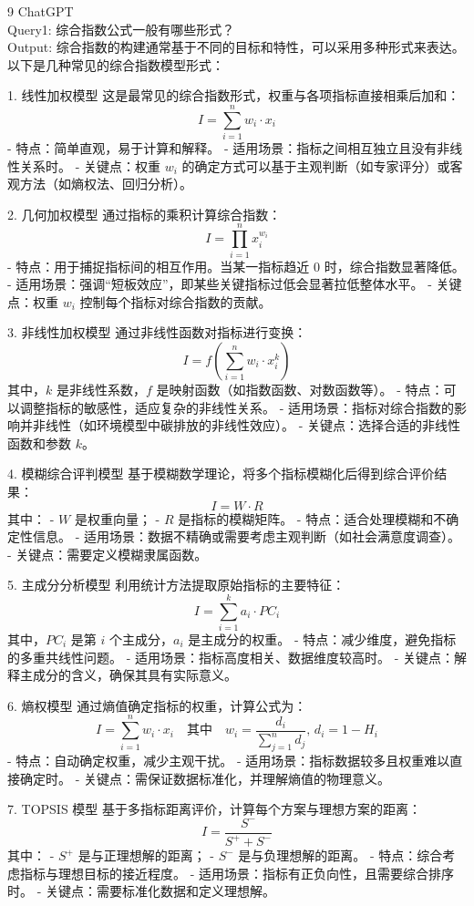 \documentclass[UTF8, fontset=windows]{mcmthesis}
\begin{document}
\begin{ReportAiUse}{9}
ChatGPT\\
Query1: 综合指数公式一般有哪些形式？\\
Output: 综合指数的构建通常基于不同的目标和特性，可以采用多种形式来表达。以下是几种常见的综合指数模型形式：

1. 线性加权模型
这是最常见的综合指数形式，权重与各项指标直接相乘后加和：
\[
I = \sum_{i=1}^n w_i \cdot x_i
\]
- 特点：简单直观，易于计算和解释。
- 适用场景：指标之间相互独立且没有非线性关系时。
- 关键点：权重 \( w_i \) 的确定方式可以基于主观判断（如专家评分）或客观方法（如熵权法、回归分析）。


2. 几何加权模型
通过指标的乘积计算综合指数：
\[
I = \prod_{i=1}^n x_i^{w_i}
\]
- 特点：用于捕捉指标间的相互作用。当某一指标趋近 0 时，综合指数显著降低。
- 适用场景：强调“短板效应”，即某些关键指标过低会显著拉低整体水平。
- 关键点：权重 \( w_i \) 控制每个指标对综合指数的贡献。

3. 非线性加权模型
通过非线性函数对指标进行变换：
\[
I = f\left(\sum_{i=1}^n w_i \cdot x_i^k \right)
\]
其中，\( k \) 是非线性系数，\( f \) 是映射函数（如指数函数、对数函数等）。
- 特点：可以调整指标的敏感性，适应复杂的非线性关系。
- 适用场景：指标对综合指数的影响并非线性（如环境模型中碳排放的非线性效应）。
- 关键点：选择合适的非线性函数和参数 \( k \)。

4. 模糊综合评判模型
基于模糊数学理论，将多个指标模糊化后得到综合评价结果：
\[
I = W \cdot R
\]
其中：
- \( W \) 是权重向量；
- \( R \) 是指标的模糊矩阵。
- 特点：适合处理模糊和不确定性信息。
- 适用场景：数据不精确或需要考虑主观判断（如社会满意度调查）。
- 关键点：需要定义模糊隶属函数。

5. 主成分分析模型
利用统计方法提取原始指标的主要特征：
\[
I = \sum_{i=1}^k a_i \cdot PC_i
\]
其中，\( PC_i \) 是第 \( i \) 个主成分，\( a_i \) 是主成分的权重。
- 特点：减少维度，避免指标的多重共线性问题。
- 适用场景：指标高度相关、数据维度较高时。
- 关键点：解释主成分的含义，确保其具有实际意义。

6. 熵权模型
通过熵值确定指标的权重，计算公式为：
\[
I = \sum_{i=1}^n w_i \cdot x_i \quad \text{其中} \quad w_i = \frac{d_i}{\sum_{j=1}^n d_j}, \, d_i = 1 - H_i
\]
- 特点：自动确定权重，减少主观干扰。
- 适用场景：指标数据较多且权重难以直接确定时。
- 关键点：需保证数据标准化，并理解熵值的物理意义。

7. TOPSIS 模型
基于多指标距离评价，计算每个方案与理想方案的距离：
\[
I = \frac{S^-}{S^+ + S^-}
\]
其中：
- \( S^+ \) 是与正理想解的距离；
- \( S^- \) 是与负理想解的距离。
- 特点：综合考虑指标与理想目标的接近程度。
- 适用场景：指标有正负向性，且需要综合排序时。
- 关键点：需要标准化数据和定义理想解。


\end{ReportAiUse}
\end{document}
